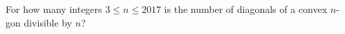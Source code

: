 For how many integers $ 3\le n\le2017 $ is the number of diagonals of a convex $ n $-gon divisible by $ n $?
